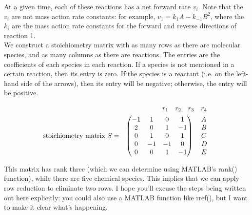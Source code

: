 \documentclass{article}
\begin{document}
At a given time, each of these reactions has a net forward rate $v_i$. Note that the $v_i$ are not mass action rate constants: for example, $v_1 = k_1 A - k_{-1} B^2$, where the $k_i$ are the mass action rate constants for the forward and reverse directions of reaction 1.\\

We construct a stoichiometry matrix with as many rows as there are molecular species, and as many columns as there are reactions. The entries are the coefficients of each species in each reaction. If a species is not mentioned in a certain reaction, then its entry is zero. If the species is a reactant (i.e. on the left-hand side of the arrows), then its entry will be negative; otherwise, the entry will be positive.

\begin{eqnarray*}
&  & \hspace{0.25cm}
\begin{array}{ccccc}
       r_1 & r_2 & r_3 & r_4
     \end{array}\\
\textrm{stoichiometry matrix } S & = & \begin{pmatrix} -1 & 1 & 0 & 1\\
2 & 0 & 1 & -1\\
0 & 1 & 0 & 1\\
0 & -1 & -1 & 0\\
0 & 0 & 1 & -1
\end{pmatrix} 
\hspace{0.2 cm}
\begin{array}{l}
       A\\
      B\\
      C\\
      D\\
      E
     \end{array}
\end{eqnarray*}

This matrix has rank three (which we can determine using MATLAB's rank() function), while there are five chemical species. This implies that we can apply row reduction to eliminate two rows. I hope you'll excuse the steps being written out here explicitly: you could also use a MATLAB function like rref(), but I want to make it clear what's happening.\\
\end{document}
